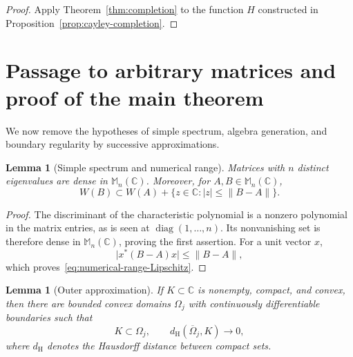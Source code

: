 \documentclass[preprints,article,submit,oneauthor]{Definitions/mdpi}
\newcounter{manuscriptresult}[section]
\theoremstyle{mdpi}
\newtheorem{lemma}[manuscriptresult]{Lemma}
\theoremstyle{definition}
\newcommand{\C}{\mathbb C}
\newcommand{\Mn}{\mathbb M_n(\C)}
\newcommand{\diag}{\operatorname{diag}}
\begin{document}
\begin{proof}
Apply Theorem~\ref{thm:completion} to the function $H$ constructed in
Proposition~\ref{prop:cayley-completion}.
\end{proof}

\section{Passage to arbitrary matrices and proof of the main theorem}
\label{sec:passage}

We now remove the hypotheses of simple spectrum, algebra generation,
and boundary regularity by successive approximations.

\begin{lemma}[Simple spectrum and numerical range]
\label{lem:simple-spectrum-density}
Matrices with $n$ distinct eigenvalues are dense in $\Mn$.  Moreover,
for $A,B\in\Mn$,
\begin{equation}
  W(B)\subset
  W(A)+\{z\in\C:\lvert z\rvert\leq\lVert B-A\rVert\}.
  \label{eq:numerical-range-Lipschitz}
\end{equation}
\end{lemma}

\begin{proof}
The discriminant of the characteristic polynomial is a nonzero
polynomial in the matrix entries, as is seen at
$\diag(1,\ldots,n)$.  Its nonvanishing set is therefore dense in
$\Mn$, proving the first assertion.  For a unit vector $x$,
\[
  \lvert x^*(B-A)x\rvert\leq\lVert B-A\rVert,
\]
which proves~\eqref{eq:numerical-range-Lipschitz}.
\end{proof}

\begin{lemma}[Outer approximation]
\label{lem:smooth-outer-approximation}
If $K\subset\C$ is nonempty, compact, and convex, then there are
bounded convex domains $\Omega_j$ with continuously differentiable
boundaries such that
\begin{equation}
  K\subset\Omega_j,
  \qquad
  d_{\mathrm H}(\overline\Omega_j,K)\longrightarrow0,
  \label{eq:outer-Hausdorff}
\end{equation}
where $d_{\mathrm H}$ denotes the Hausdorff distance between compact
sets.
\end{lemma}
\end{document}
